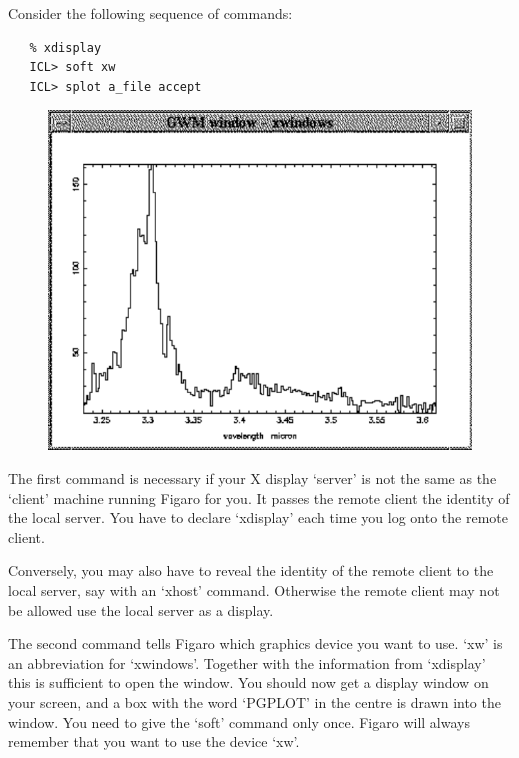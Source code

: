 \documentclass[11pt,twoside]{article}
\begin{document}
   Consider the following sequence of commands:

\begin{verbatim}
   % xdisplay
   ICL> soft xw
   ICL> splot a_file accept
\end{verbatim}

\begin{figure}[htb]
\begin{center}
\includegraphics{sun86_spec}
\end{center}
\end{figure}

   The first command is necessary if your X display `server' is not
   the same as the `client' machine running Figaro for you. It
   passes the remote client the identity of the local server. You have
   to declare `xdisplay' each time you log onto the remote client.

   Conversely, you may also have to reveal the identity of the remote
   client to the local server, say with an `xhost' command. Otherwise
   the remote client may not be allowed use the local server as a
   display.

   The second command tells Figaro which graphics device you want to
   use. `xw' is an abbreviation for `xwindows'. Together with the
   information from `xdisplay' this is sufficient to open the window.
   You should now get a display window on your screen, and a box with
   the word `PGPLOT' in the centre is drawn into the window. You need
   to give the `soft' command only once. Figaro will always remember
   that you want to use the device `xw'.
\end{document}
